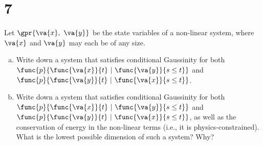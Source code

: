 \section{7}

Let $\gpr{\va{x},\ \va{y}}$ be the state variables of a non-linear system, where $\va{x}$ and $\va{y}$ may each be of any size.

\begin{enumerate}[(a)]
	\item Write down a system that satisfies conditional Gaussinity for both $\func{p}{\func{\va{x}}{t}\ \vert\ \func{\va{y}}{s \leq t}}$ and $\func{p}{\func{\va{y}}{t}\ \vert\ \func{\va{x}}{s \leq t}}$.
	
	\item Write down a system that satisfies conditional Gaussinity for both $\func{p}{\func{\va{x}}{t}\ \vert\ \func{\va{y}}{s \leq t}}$ and $\func{p}{\func{\va{y}}{t}\ \vert\ \func{\va{x}}{s \leq t}}$, as well as the conservation of energy in the non-linear terms (i.e., it is physics-constrained). What is the lowest possible dimension of such a system? Why?
\end{enumerate}

